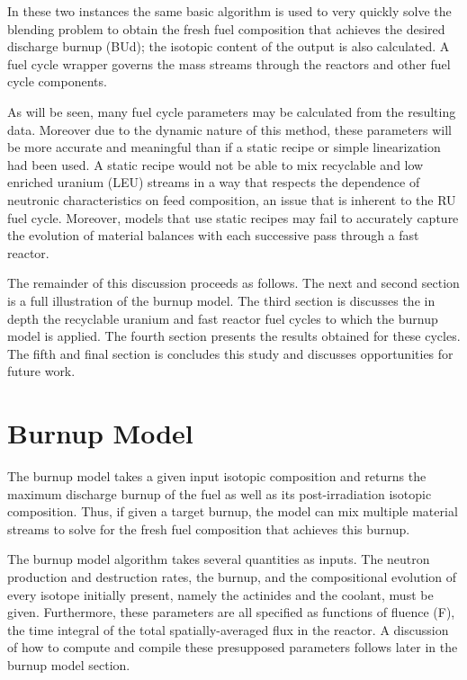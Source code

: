 In these two instances the same basic algorithm is used to very quickly solve the blending problem 
to obtain the fresh fuel composition that achieves the desired discharge burnup (BUd); the isotopic 
content of the output is also calculated.   A fuel cycle wrapper governs the mass streams through 
the reactors and other fuel cycle components.  

As will be seen, many fuel cycle parameters may be calculated from the resulting data.  Moreover 
due to the dynamic nature of this method, these parameters will be more accurate and meaningful 
than if a static recipe or simple linearization had been used.  A static recipe would not be able 
to mix recyclable and low enriched uranium (LEU) streams in a way that respects the dependence of 
neutronic characteristics on feed composition, an issue that is inherent to the RU fuel cycle.  
Moreover, models that use static recipes may fail to accurately capture the evolution of material 
balances with each successive pass through a fast reactor.   

The remainder of this discussion proceeds as follows. The next and second section is a 
full illustration of the burnup model.  The third section is discusses the in depth the recyclable 
uranium and fast reactor fuel cycles to which the burnup model is applied.  The fourth section 
presents the results obtained for these cycles.  The fifth and final section is concludes this 
study and discusses opportunities for future work. 




\section{Burnup Model}
\label{1g_sec:bu_model}
The burnup model takes a given input isotopic composition and returns the maximum discharge 
burnup of the fuel as well as its post-irradiation isotopic composition.  Thus, if given a 
target burnup, the model can mix multiple material streams to solve for the fresh fuel composition 
that achieves this burnup.

The burnup model algorithm takes several quantities as inputs.
The neutron production and destruction rates, the burnup, and the compositional evolution of 
every isotope initially present, namely the actinides and the coolant, must be given.  Furthermore, 
these parameters are all specified as functions of fluence (F), the time integral of the total spatially-averaged 
flux in the reactor. A discussion of how to compute and compile these presupposed parameters follows 
later in the burnup model section. 


